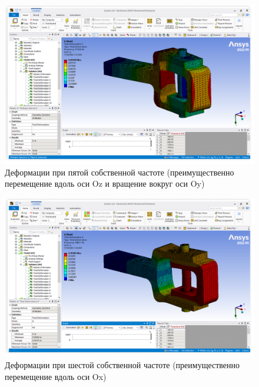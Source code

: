 \begin{figure}[H] 
	\center
	\includegraphics[width=\textwidth]{images/mod5.png}
	\caption{Деформации при пятой собственной частоте (преимущественно перемещение вдоль оси Oz и вращение вокруг оси Oy)}
	\label{fig:mod5}
\end{figure}

\begin{figure}[H] 
	\center
	\includegraphics[width=\textwidth]{images/mod6.png}
	\caption{Деформации при шестой собственной частоте (преимущественно перемещение вдоль оси Ox)}
	\label{fig:mod6}
\end{figure}

